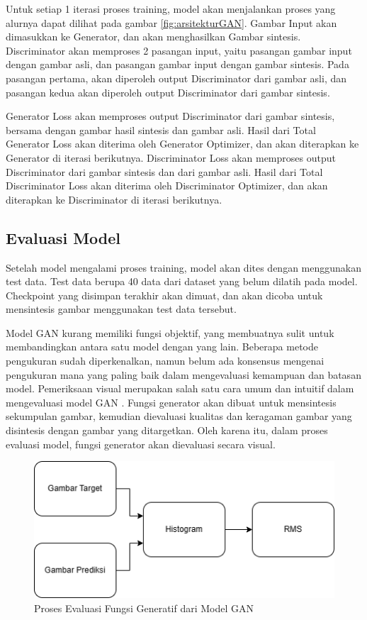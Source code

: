 Untuk setiap 1 iterasi proses training, model akan menjalankan proses yang alurnya dapat dilihat pada gambar \ref{fig:arsitekturGAN}. 
Gambar Input akan dimasukkan ke Generator, dan akan menghasilkan Gambar sintesis. 
Discriminator akan memproses 2 pasangan input, yaitu pasangan gambar input dengan gambar asli, dan pasangan gambar input dengan gambar sintesis. 
Pada pasangan pertama, akan diperoleh output Discriminator dari gambar asli, dan pasangan kedua akan diperoleh output Discriminator dari gambar sintesis. 

Generator Loss akan memproses output Discriminator dari gambar sintesis, bersama dengan gambar hasil sintesis dan gambar asli. 
Hasil dari Total Generator Loss akan diterima oleh Generator Optimizer, dan akan diterapkan ke Generator di iterasi berikutnya. 
Discriminator Loss akan memproses output Discriminator dari gambar sintesis dan dari gambar asli. 
Hasil dari Total Discriminator Loss akan diterima oleh Discriminator Optimizer, dan akan diterapkan ke Discriminator di iterasi berikutnya.

\subsection{Evaluasi Model}
\label{subsec:evaluasi}

Setelah model mengalami proses training, model akan dites dengan menggunakan test data. 
Test data berupa 40 data dari dataset yang belum dilatih pada model. 
Checkpoint yang disimpan terakhir akan dimuat, dan akan dicoba untuk mensintesis gambar menggunakan test data tersebut. 

Model GAN kurang memiliki fungsi objektif, yang membuatnya sulit untuk membandingkan antara satu model dengan yang lain. 
Beberapa metode pengukuran sudah diperkenalkan, namun belum ada konsensus mengenai pengukuran mana yang paling baik dalam mengevaluasi kemampuan dan batasan model. 
Pemeriksaan visual merupakan salah satu cara umum dan intuitif dalam mengevaluasi model GAN \parencite{proConsGANEvaluation}. 
Fungsi generator akan dibuat untuk mensintesis sekumpulan gambar, kemudian dievaluasi kualitas dan keragaman gambar yang disintesis dengan gambar yang ditargetkan. 
Oleh karena itu, dalam proses evaluasi model, fungsi generator akan dievaluasi secara visual.

\begin{figure}[ht]
  \centering
  \includegraphics[scale=0.7]{gambar/alur evaluasi model.png}
  \caption{Proses Evaluasi Fungsi Generatif dari Model GAN}
  \label{fig:evaluating}
\end{figure}

